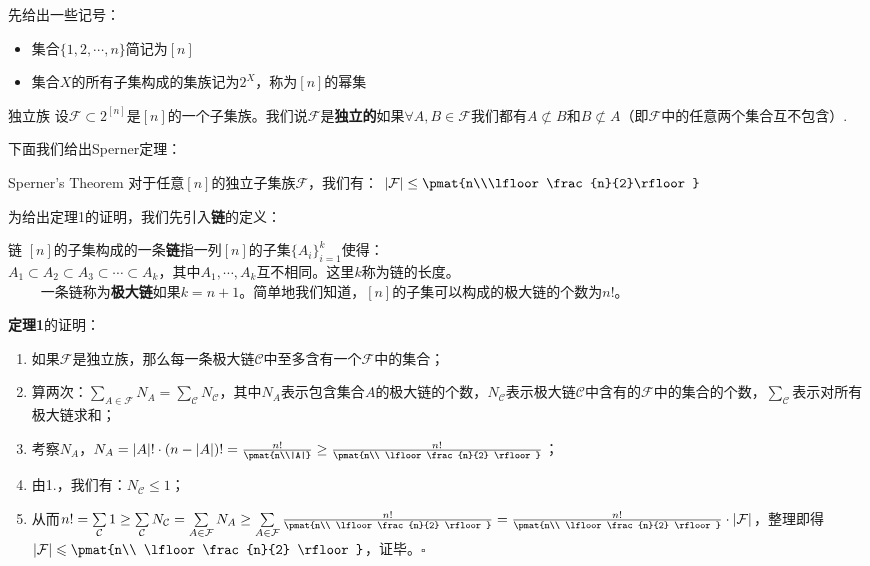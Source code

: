 
先给出一些记号：
\begin{itemize}
\item 集合$\{1,2,\cdots,n\}$简记为$[n]$
\item 集合$X$的所有子集构成的集族记为$2^{X}$，称为$[n]$的幂集
\end{itemize}

\begin{definition}{独立族}
设$\mathcal{F}\subset 2^{[n]}$是$[n]$的一个子集族。我们说$\mathcal{F}$是\textbf{独立的}如果$\forall A,B\in \mathcal{F}$我们都有$A\not\subset B$和$B\not\subset A$（即$\mathcal{F}$中的任意两个集合互不包含）.
\end{definition}

下面我们给出Sperner定理：
\begin{theorem}{Sperner's Theorem}
对于任意$[n]$的独立子集族$\mathcal{F}$，我们有：
$|\mathcal{F}|\leq \pmat{n\\\lfloor \frac{n}{2}\rfloor}$
\end{theorem}
为给出定理1的证明，我们先引入\textbf{链}的定义：
\begin{definition}{链}
$[n]$的子集构成的一条\textbf{链}指一列$[n]$的子集$\{A_i\}_{i=1}^{k}$使得：\\
$A_1\subset A_2\subset A_3\subset \cdots \subset A_k$，其中$A_1,\cdots,A_k$互不相同。这里$k$称为链的长度。\\
$\qquad$
一条链称为\textbf{极大链}如果$k=n+1$。简单地我们知道，$[n]$的子集可以构成的极大链的个数为$n!$。
\end{definition}

\textbf{定理1}的证明：\\
\begin{enumerate}
\item 如果$\mathcal{F}$是独立族，那么每一条极大链$\mathcal{C}$中至多含有一个$\mathcal{F}$中的集合；
\item 算两次：$\sum\limits_{A\in \mathcal{F}}N_A=\sum\limits_{\mathcal{C}}N_{\mathcal{C}}$，其中$N_A$表示包含集合$A$的极大链的个数，$N_{\mathcal{C}}$表示极大链$\mathcal{C}$中含有的$\mathcal{F}$中的集合的个数，$\sum\limits_{\mathcal{C}}$表示对所有极大链求和；
\item 考察$N_A$，$N_A=|A|!\cdot (n-|A|)!=\frac{n!}{\pmat{n\\|A|}}\geq \frac{n!}{\pmat{n\\ \lfloor\frac{n}{2} \rfloor}}$；
\item 由1.，我们有：$N_{\mathcal{C}}\leq 1$；
\item 从而$n!=\sum\limits_{\mathcal{C}}1\geq \sum\limits_{\mathcal{C}}N_{\mathcal{C}}=\sum\limits_{A\in \mathcal{F}}N_A\geq \sum\limits_{A\in \mathcal{F}}\frac{n!}{\pmat{n\\ \lfloor\frac{n}{2} \rfloor}}=\frac{n!}{\pmat{n\\ \lfloor\frac{n}{2} \rfloor}}\cdot |\mathcal{F}|$，整理即得$|\mathcal{F}|\leqslant\pmat{n\\ \lfloor\frac{n}{2} \rfloor}$，证毕。$\square$
\end{enumerate}

